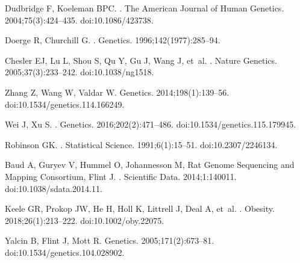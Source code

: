 \documentclass[10pt,letterpaper]{article}
\begin{document}
\begin{thebibliography}{10}
Dudbridge F, Koeleman BPC.
.
\newblock The American Journal of Human Genetics. 2004;75(3):424--435.
\newblock doi:{10.1086/423738}.

Doerge R, Churchill G.
.
\newblock Genetics. 1996;142(1977):285--94.

Chesler EJ, Lu L, Shou S, Qu Y, Gu J, Wang J, et~al.
.
\newblock Nature Genetics. 2005;37(3):233--242.
\newblock doi:{10.1038/ng1518}.

Zhang Z, Wang W, Valdar W.
\newblock Genetics. 2014;198(1):139--56.
\newblock doi:{10.1534/genetics.114.166249}.

Wei J, Xu S.
.
\newblock Genetics. 2016;202(2):471--486.
\newblock doi:{10.1534/genetics.115.179945}.

Robinson GK.
.
\newblock Statistical Science. 1991;6(1):15--51.
\newblock doi:{10.2307/2246134}.

Baud A, Guryev V, Hummel O, Johannesson M, {Rat Genome Sequencing and Mapping
  Consortium}, Flint J.
.
\newblock Scientific Data. 2014;1:140011.
\newblock doi:{10.1038/sdata.2014.11}.

Keele GR, Prokop JW, He H, Holl K, Littrell J, Deal A, et~al.
.
\newblock Obesity. 2018;26(1):213--222.
\newblock doi:{10.1002/oby.22075}.

Yalcin B, Flint J, Mott R.
\newblock Genetics. 2005;171(2):673--81.
\newblock doi:{10.1534/genetics.104.028902}.


\end{thebibliography}
\end{document}
